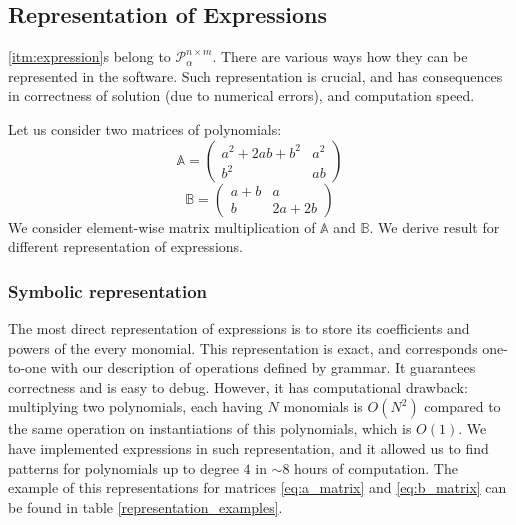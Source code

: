 \subsection{Representation of Expressions} \label{representation}
\ref{itm:expression}s belong to $\mathcal{P}^{n \times m}_\alpha$. There are various
ways how they can be represented in the software. Such representation is crucial, and has consequences in
correctness of solution (due to numerical errors), and computation speed.

Let us consider two matrices of polynomials:
\begin{equation}\label{eq:a_matrix}
\mathbb{A} = \begin{pmatrix} a^2 + 2ab + b^2 & a^2\\ b^2 & ab \end{pmatrix} 
\end{equation}
\begin{equation}\label{eq:b_matrix}
\mathbb{B} = \begin{pmatrix} a + b & a\\ b & 2a + 2b \end{pmatrix}
\end{equation}
We consider element-wise matrix multiplication of $\mathbb{A}$ and $\mathbb{B}$. We derive result for different representation of expressions.



\subsubsection{Symbolic representation}
The most direct representation of expressions is to store its coefficients and powers of the every monomial.
This representation is exact, and corresponds one-to-one with our description of operations
defined by grammar. It guarantees correctness and is easy to debug. 
However, it has computational drawback: multiplying two polynomials, each having $N$ monomials is $O(N^2)$ compared to the same operation on instantiations of this polynomials, which is $O(1)$.
We have implemented expressions in such representation, and it allowed us
to find patterns for polynomials up to degree $4$ in $\sim 8$ hours of computation. 
The example of this representations for matrices \ref{eq:a_matrix} and \ref{eq:b_matrix} can be found
in table \ref{representation_examples}.

